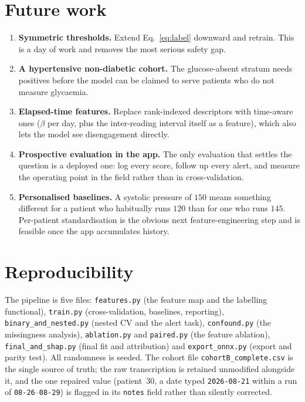 \documentclass[11pt,a4paper]{article}
\begin{document}
\section{Future work}

\begin{enumerate}
\item \textbf{Symmetric thresholds.} Extend Eq.~\eqref{eq:label} downward and
retrain. This is a day of work and removes the most serious safety gap.

\item \textbf{A hypertensive non-diabetic cohort.} The glucose-absent stratum needs
positives before the model can be claimed to serve patients who do not measure
glycaemia.

\item \textbf{Elapsed-time features.} Replace rank-indexed descriptors with
time-aware ones ($\beta$ per day, plus the inter-reading interval itself as a
feature), which also lets the model see disengagement directly.

\item \textbf{Prospective evaluation in the app.} The only evaluation that settles
the question is a deployed one: log every score, follow up every alert, and measure
the operating point in the field rather than in cross-validation.

\item \textbf{Personalised baselines.} A systolic pressure of $150$ means something
different for a patient who habitually runs $120$ than for one who runs $145$.
Per-patient standardisation is the obvious next feature-engineering step and is
feasible once the app accumulates history.
\end{enumerate}

\section{Reproducibility}

The pipeline is five files: \texttt{features.py} (the feature map and the labelling
functional), \texttt{train.py} (cross-validation, baselines, reporting),
\texttt{binary\_and\_nested.py} (nested CV and the alert task),
\texttt{confound.py} (the missingness analysis), \texttt{ablation.py} and
\texttt{paired.py} (the feature ablation), \texttt{final\_and\_shap.py} (final fit
and attribution) and \texttt{export\_onnx.py} (export and parity test). All
randomness is seeded. The cohort file
\texttt{cohortB\_complete.csv} is the single source of truth; the raw transcription
is retained unmodified alongside it, and the one repaired value (patient~30, a date
typed \texttt{2026-08-21} within a run of \texttt{08-26}--\texttt{08-29}) is flagged
in its \texttt{notes} field rather than silently corrected.
\end{document}
